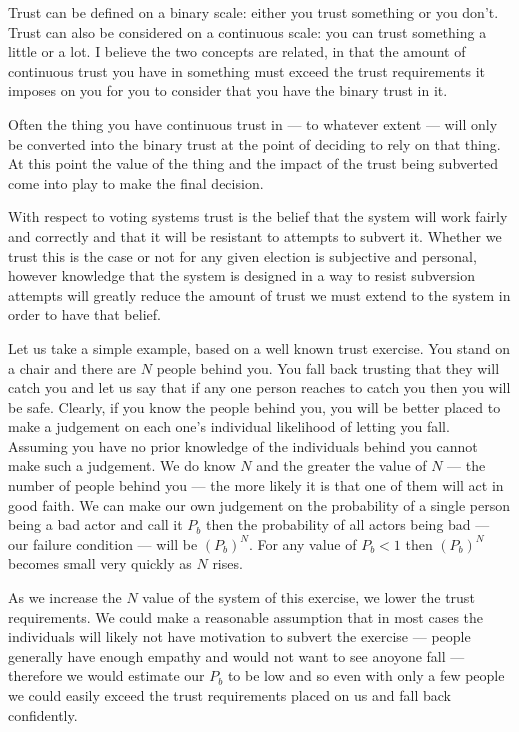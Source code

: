 Trust can be defined on a binary scale: either you trust something or you don't. Trust can also be considered on a continuous scale: you can trust something a little or a lot. I believe the two concepts are related, in that the amount of continuous trust you have in something must exceed the trust requirements it imposes on you for you to consider that you have the binary trust in it.

Often the thing you have continuous trust in --- to whatever extent --- will only be converted into the binary trust at the point of deciding to rely on that thing. At this point the value of the thing and the impact of the trust being subverted come into play to make the final decision.

With respect to voting systems trust is the belief that the system will work fairly and correctly and that it will be resistant to attempts to subvert it. Whether we trust this is the case or not for any given election is subjective and personal, however knowledge that the system is designed in a way to resist subversion attempts will greatly reduce the amount of trust we must extend to the system in order to have that belief.

Let us take a simple example, based on a well known trust exercise. You stand on a chair and there are $N$ people behind you. You fall back trusting that they will catch you and let us say that if any one person reaches to catch you then you will be safe. Clearly, if you know the people behind you, you will be better placed to make a judgement on each one's individual likelihood of letting you fall. Assuming you have no prior knowledge of the individuals behind you cannot make such a judgement. We do know $N$ and the greater the value of $N$ --- the number of people behind you --- the more likely it is that one of them will act in good faith. We can make our own judgement on the probability of a single person being a bad actor and call it $P_b$ then the probability of all actors being bad --- our failure condition --- will be $(P_b)^N$. For any value of $P_b < 1$ then $(P_b)^N$ becomes small very quickly as $N$ rises.

As we increase the $N$ value of the system of this exercise, we lower the trust requirements. We could make a reasonable assumption that in most cases the individuals will likely not have motivation to subvert the exercise --- people generally have enough empathy and would not want to see anoyone fall --- therefore we would estimate our $P_b$ to be low and so even with only a few people we could easily exceed the trust requirements placed on us and fall back confidently.


